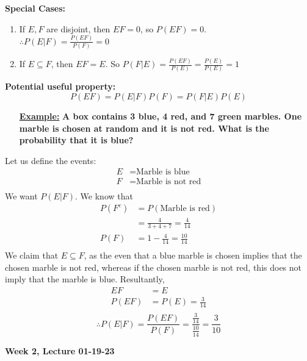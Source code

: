 \documentclass[10pt]{article}
\begin{document}
\textbf{Special Cases:}
\begin{enumerate}
    \item If $E,F$ are disjoint, then $EF = 0$, so $P(EF) = 0$. \\
        $\therefore P(E|F) = \frac{P(EF)}{P(F)} = 0$
    \item If $E \subseteq F$, then $EF = E$. So $P(F|E) = \frac{P(EF)}{P(E)} =
        \frac{P(E)}{P(E)} = 1$
\end{enumerate}

\textbf{Potential useful property:}
$$ \boxed{P(EF) = P(E|F)P(F) = P(F|E)P(E)}$$

\begin{itemize}
    \item[\textbf{\underline{Example:}}] \textbf{A box contains 3 blue, 4 red,
            and 7
        green marbles. One marble is chosen at random and it is not red. What is
    the probability that it is blue?}
\end{itemize}
    Let us define the events:
        $$ \begin{aligned}
            E &= \text{Marble is blue}\\
            F &= \text{Marble is not red} \\
        \end{aligned} $$
        We want $P(E | F)$.
        We know that
        $$ \begin{aligned}
            P(F^c) &= P(\text{Marble is red})\\
                   &= \frac{4}{3 + 4 + 7} = \frac{4}{14} \\
            P(F) &= 1 - \frac{4}{14} = \frac{10}{14} \\
        \end{aligned} $$
        We claim that $E \subseteq F$, as the even that a blue marble is chosen
        implies that the chosen marble is not red, whereas if the chosen marble
        is not red, this does not imply that the marble is blue. Resultantly,
        $$ \begin{aligned} 
            EF &= E \\
            P(EF) &= P(E) = \frac{3}{14} \\
        \end{aligned}$$
        $$ \therefore P(E|F) = \frac{P(EF)}{P(F)} =
        \frac{\frac{3}{14}}{\frac{10}{14}} = \frac{3}{10}$$

        \newpage

\begin{center}
	\Large \textbf{Week 2, Lecture 01-19-23}
\end{center}
\normalsize
\end{document}
